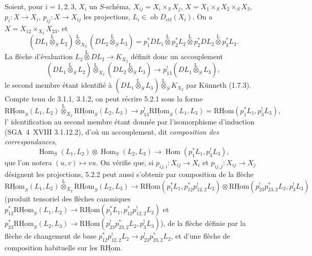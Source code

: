 \documentclass[11pt]{article}
\DeclareMathOperator{\Hom}{Hom}
\newcommand{\R}{\mathrm{R}}\newcommand{\RHomCore}{\mathrm{RHom}}
\providecommand{\RHom}{\RHomCore}
\providecommand{\uRHom}{\underline{\RHom}}
\providecommand{\RHom}{\RHomCore}
\providecommand{\Hom}{\operatorname{Hom}}
\providecommand{\RHom}{\R\mathcal{H}om}
\providecommand{\R}{\mathrm R}
\providecommand{\RHom}{\RHomCore}
\providecommand{\Hom}{\operatorname{Hom}}
\begin{document}
Soient, pour $i=1,2,3$, $X_i$ un $S$-schéma, $X_{ij}=X_i\times_SX_j$, $X=X_1\times_SX_2\times_SX_3$, $p_i:X\to X_i$, $p_{ij}:X\to X_{ij}$ les projections, $L_i\in\operatorname{ob}D_{\mathrm{ctf}}(X_i)$. On a $X=X_{12}\times_{X_2}X_{23}$, et
\[
(DL_1\overset{\mathrm{L}}{\otimes}_SL_2)\overset{\mathrm{L}}{\otimes}_{X_2}(DL_2\overset{\mathrm{L}}{\otimes}_SL_3)
=p_1^*DL_1\overset{\mathrm{L}}{\otimes}p_2^*L_2\overset{\mathrm{L}}{\otimes}p_2^*DL_2\overset{\mathrm{L}}{\otimes}p_3^*L_3.
\]
La flèche d'évaluation $L_2\overset{\mathrm{L}}{\otimes}DL_2\to K_{X_2}$ définit donc un accouplement
\begin{equation}
\tag{5.2.1}
(DL_1\overset{\mathrm{L}}{\otimes}_SL_2)\overset{\mathrm{L}}{\otimes}_{X_2}(DL_2\overset{\mathrm{L}}{\otimes}_SL_3)\longrightarrow p_{13}^!(DL_1\overset{\mathrm{L}}{\otimes}_SL_3),
\end{equation}
le second membre étant identifié à $(DL_1\overset{\mathrm{L}}{\otimes}_SL_3)\overset{\mathrm{L}}{\otimes}_SK_{X_2}$ par Künneth (1.7.3). Compte tenu de 3.1.1, 3.1.2, on peut récrire 5.2.1 sous la forme
\begin{equation}
\tag{5.2.2}
\uRHom_S(L_1,L_2)\overset{\mathrm{L}}{\otimes}_{X_2}\uRHom_S(L_2,L_3)\longrightarrow p_{13}^!\uRHom_S(L_1,L_3)=\uRHom(p_1^*L_1,p_3^!L_3),
\end{equation}
l'%
identification au second membre étant donnée par l'isomorphisme d'induction (SGA~4~XVIII 3.1.12.2), d'où un accouplement, dit \emph{composition des correspondances},
\begin{equation}
\tag{5.2.3}
\Hom_S(L_1,L_2)\otimes\Hom_S(L_2,L_3)\longrightarrow\Hom(p_1^*L_1,p_3^!L_3),
\end{equation}
que l'on notera $(u,v)\mapsto vu$. On vérifie que, si $p_{ij,i}:X_{ij}\to X_i$ et $p_{ij,j}:X_{ij}\to X_j$ désignent les projections, 5.2.2 peut aussi s'obtenir par composition de la flèche
\[
\uRHom_S(L_1,L_2)\overset{\mathrm{L}}{\otimes}_{X_2}\uRHom_S(L_2,L_3)
\longrightarrow
\uRHom(p_1^*L_1,p_{12}^*p_{12,2}^!L_2)
\otimes
\uRHom(p_{23}^!p_{23,2}^*L_2,p_3^!L_3)
\]
(produit tensoriel des flèches canoniques $p_{12}^*\uRHom_S(L_1,L_2)\to\uRHom(p_1^*L_1,p_{12}^*p_{12,2}^!L_2)$ et $p_{23}^*\uRHom_S(L_2,L_3)\to\uRHom(p_{23}^!p_{23,2}^*L_2,p_3^!L_3)$), de la flèche définie par la flèche de changement de base $p_{12}^*p_{12,2}^!L_2\to p_{23}^!p_{23,2}^*L_2$, et d'une flèche de composition habituelle sur les $\uRHom$.
\end{document}
